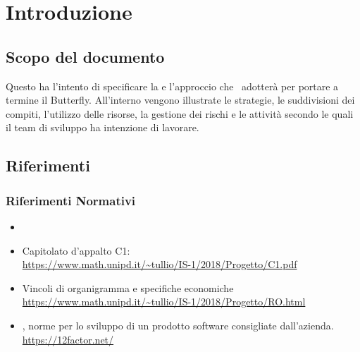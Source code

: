 \newpage
\section{Introduzione} \label{Introduzione}
	
	\subsection{Scopo del documento}
	Questo  ha l'intento di specificare la  e l'approccio che \gruppo\ adotterà per portare a termine il  Butterfly.
	All'interno vengono illustrate le strategie, le suddivisioni dei compiti, l'utilizzo delle risorse, la gestione dei rischi e le attività secondo le quali il team di sviluppo ha intenzione di lavorare.
	
	
    

	
	\subsection{Riferimenti}
		\subsubsection{Riferimenti Normativi}
			\begin{itemize}
				\item \NdPd
				\item Capitolato d'appalto C1:\\
				\url{https://www.math.unipd.it/~tullio/IS-1/2018/Progetto/C1.pdf}
				\item Vincoli di organigramma e specifiche economiche\\
				\url{https://www.math.unipd.it/~tullio/IS-1/2018/Progetto/RO.html}
				\item {}, norme per lo sviluppo di un prodotto software consigliate dall'azienda.\\
				\url{https://12factor.net/}
			\end{itemize}
		
